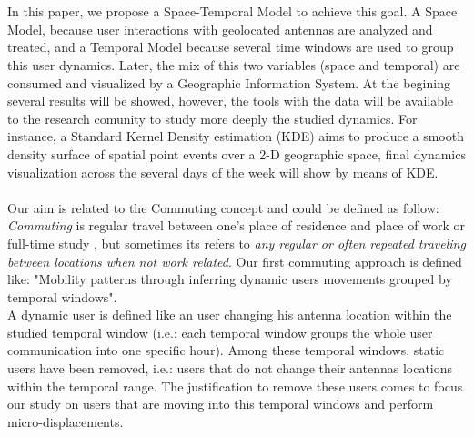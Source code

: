 \\
\\
In this paper, we propose a Space-Temporal Model to achieve this goal. A Space Model, because user interactions with geolocated antennas are analyzed and treated, and a Temporal Model because several time windows are used to group this user dynamics. Later, the mix of this two variables (space and temporal) are consumed and visualized by a Geographic Information System. At the begining several results will be showed, however, the tools with the data will be available to the research comunity to study more deeply the studied dynamics. For instance, a Standard Kernel Density estimation (KDE) aims to produce a smooth density surface of spatial point events over a 2-D geographic space\citep{SIM:SIM4780090616,5969036}, final dynamics visualization across the several days of the week will show by means of KDE.
\\
\\
Our aim is related to the Commuting concept and could be defined as follow: \emph{Commuting} is regular travel between one's place of residence and place of work or full-time study \citep{wiki:commuting}, but  sometimes its refers to \emph{any regular or often repeated traveling between locations when not work related}. Our first commuting approach is defined like: "Mobility patterns through inferring dynamic users movements grouped by temporal windows". 
\\
A dynamic user is defined like an user changing his antenna location within the studied temporal window (i.e.: each temporal window groups the whole user communication into one specific hour). Among these temporal windows, static users have been removed, i.e.: users that do not change their antennas locations within the temporal range. The justification to remove these users comes to focus our study on users that are moving into this temporal windows and perform micro-displacements.
